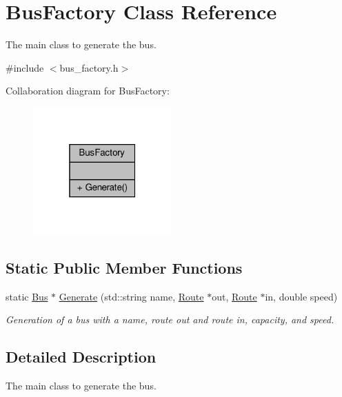 \hypertarget{classBusFactory}{}\section{Bus\+Factory Class Reference}
\label{classBusFactory}


The main class to generate the bus.  




{\ttfamily \#include $<$bus\+\_\+factory.\+h$>$}



Collaboration diagram for Bus\+Factory\+:\nopagebreak
\begin{figure}[H]
\begin{center}
\leavevmode
\includegraphics[width=151pt]{classBusFactory__coll__graph}
\end{center}
\end{figure}
\subsection*{Static Public Member Functions}
\begin{DoxyCompactItemize}
\item 
static \hyperlink{classBus}{Bus} $\ast$ \hyperlink{classBusFactory_a27b9e052143be949d9757e72a1e7a285}{Generate} (std\+::string name, \hyperlink{classRoute}{Route} $\ast$out, \hyperlink{classRoute}{Route} $\ast$in, double speed)
\begin{DoxyCompactList}\small\item\em Generation of a bus with a name, route out and route in, capacity, and speed. \end{DoxyCompactList}\end{DoxyCompactItemize}


\subsection{Detailed Description}
The main class to generate the bus. 

